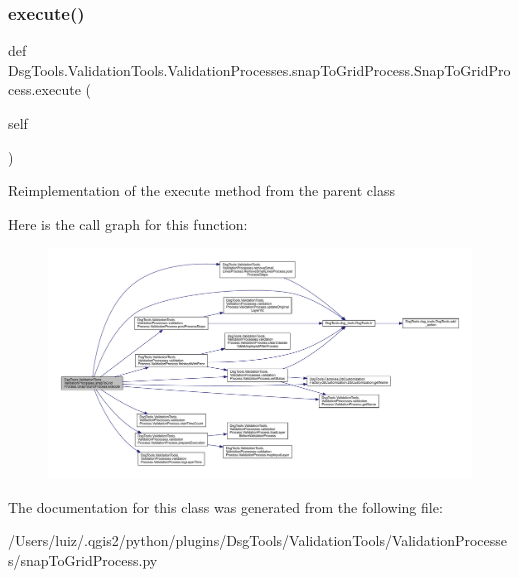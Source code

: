 \subsubsection{\texorpdfstring{execute()}{execute()}}
{\footnotesize\ttfamily def Dsg\+Tools.\+Validation\+Tools.\+Validation\+Processes.\+snap\+To\+Grid\+Process.\+Snap\+To\+Grid\+Process.\+execute (\begin{DoxyParamCaption}\item[{}]{self }\end{DoxyParamCaption})}

\begin{DoxyVerb}Reimplementation of the execute method from the parent class
\end{DoxyVerb}
 Here is the call graph for this function\+:
\nopagebreak
\begin{figure}[H]
\begin{center}
\leavevmode
\includegraphics[width=350pt]{class_dsg_tools_1_1_validation_tools_1_1_validation_processes_1_1snap_to_grid_process_1_1_snap_to_grid_process_a0984c67151ae11464a62447d22622f64_cgraph}
\end{center}
\end{figure}


The documentation for this class was generated from the following file\+:\begin{DoxyCompactItemize}
\item 
/\+Users/luiz/.\+qgis2/python/plugins/\+Dsg\+Tools/\+Validation\+Tools/\+Validation\+Processes/snap\+To\+Grid\+Process.\+py\end{DoxyCompactItemize}

